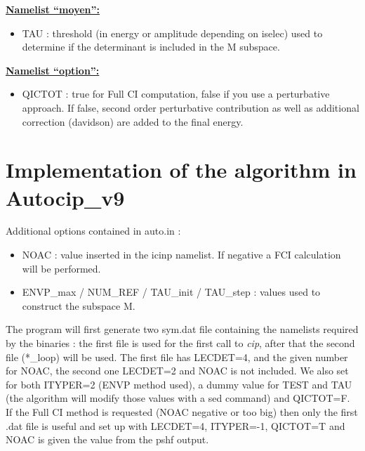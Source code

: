 \documentclass[a4paper,10pt]{article}
\begin{document}
\underline{\textbf{Namelist “moyen”:}}
\begin{itemize}
 \item TAU : threshold (in energy or amplitude depending on iselec) used to determine if the determinant is included in the M subspace.
\end{itemize}


\underline{\textbf{Namelist “option”:}}
\begin{itemize}
 \item QICTOT : true for Full CI computation, false if you use a perturbative approach. If false, second order perturbative contribution as well as additional correction (davidson) are added to the final energy.
\end{itemize}

\section{Implementation of the algorithm in Autocip\_v9}

Additional options contained in auto.in :
\begin{itemize}
 \item NOAC : value inserted in the icinp namelist. If negative a FCI calculation will be performed.
 \item ENVP\_max / NUM\_REF / TAU\_init / TAU\_step : values used to construct the subspace M. 
\end{itemize}

The program will first generate two sym.dat file containing the namelists required by the binaries : the first file is used for the first call to \textit{cip}, after that the second file (*\_loop) will be used. The first file has LECDET=4, and the given number for NOAC, the second one LECDET=2 and NOAC is not included. We also set for both ITYPER=2 (ENVP method used), a dummy value for TEST and TAU (the algorithm will modify those values with a sed command) and QICTOT=F. If the Full CI method is requested (NOAC negative or too big) then only the first .dat file is useful and set up with LECDET=4, ITYPER=-1, QICTOT=T and NOAC is given the value from the pshf output.
\end{document}

